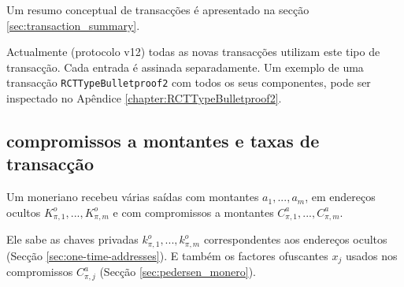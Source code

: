Um resumo conceptual de transacções é apresentado na secção \ref{sec:transaction_summary}.

Actualmente (protocolo v12) todas as novas transacções utilizam este tipo de transacção. Cada entrada é assinada separadamente. Um exemplo de uma transacção {\tt RCTTypeBulletproof2} com todos os seus componentes, pode ser inspectado no Apêndice \ref{chapter:RCTTypeBulletproof2}.



\subsection{compromissos a montantes e taxas de transacção}
\label{sec:commitments-and-fees}

Um moneriano recebeu várias saídas com montantes $a_1, ..., a_m$, em endereços ocultos $K^o_{\pi,1}, ..., K^o_{\pi,m}$
e com compromissos a montantes $C^a_{\pi,1}, ..., C^a_{\pi,m}$.

Ele sabe as chaves privadas $k^o_{\pi,1}, ..., k^o_{\pi,m}$ correspondentes aos endereços ocultos (Secção \ref{sec:one-time-addresses}). E também os factores ofuscantes $x_j$ usados nos compromissos $C^a_{\pi,j}$ (Secção \ref{sec:pedersen_monero}).


